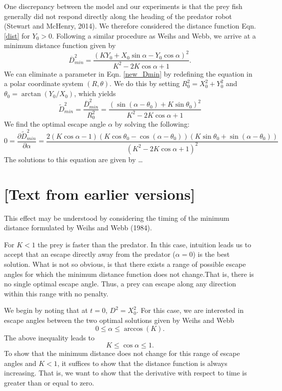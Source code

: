\documentclass[12pt]{article}
\def\ds{\displaystyle}
\def\d{\partial}
\newcommand{\ol}{\overline}
\begin{document}
One discrepancy between the model and our experiments is that the prey fish generally did not respond directly along the heading of the predator robot (Stewart and McHenry, 2014). We therefore considered the distance function Eqn. \ref{dist} for $Y_0>0$. Following a similar procedure as Weihs and Webb, we arrive at a minimum distance function given by
% 
\begin{equation}
\ol D^2_{min}=\frac{(K Y_0+X_0 \sin \alpha -Y_0\cos \alpha)^2}{K^2-2 K \cos \alpha +1}. 
\label{new_Dmin}
\end{equation}
%
We can eliminate a parameter in Eqn. \ref{new_Dmin} by redefining the equation in a polar coordinate system $(R, \theta)$. We do this by setting $R_0^2 = X_0^2 + Y_0^2$ and $\theta_0 = \arctan(Y_0/X_0)$, which yields
%
\begin{equation}
\widetilde{D}^2_{min}= \ds\frac{\ol{D}^2_{min}}{R_0^2 }=
\ds\frac{\left ( \sin(\alpha - \theta_0) + K \sin \theta_0 \right )^2}{K^2-2 K \cos \alpha +1} 
\label{Dmin_polar}
\end{equation}
%
We find the optimal escape angle $\alpha$ by solving the following:
%
\begin{equation}
0 = \frac{\d \widetilde{D}^2_{min}}{\d \alpha} = 
\frac{2(K \cos \alpha - 1)(K\cos \theta_0 - \cos(\alpha - \theta_0))(K\sin \theta_0 + \sin(\alpha -\theta_0))}
{(K^2 - 2K \cos \alpha + 1)^2}
\end{equation} 
%
The solutions to this equation are given by \dots



\section{[Text from earlier versions]}


This effect may be understood by considering the timing of the minimum distance formulated by Weihs and Webb (1984). 

For $K<1$ the prey is faster than the predator. In this case, intuition leads us to accept that an escape directly away from the predator ($\alpha =0$) is the best solution. What is not so obvious, is that there exists a range of possible escape angles for which the minimum distance function does not change.That is, there is no single optimal escape angle. Thus, a prey can escape along any direction within this range with no penalty.

We begin by noting that at $t=0$, $D^2 = X_0^2.$ For this case, we are interested in escape angles between the two optimal solutions given by Weihs and Webb
%
\begin{equation}
0 \leq \alpha \leq \arccos(K).
\label{anglerange}
\end{equation}
The above inequality leads to 
\begin{equation}
K \leq \cos\alpha \leq 1.
\label{cosinebound}
\end{equation}      
%
To show that the minimum distance does not change for this range of escape angles and $K<1$, it suffices to show that the distance function is always increasing. That is, we want to show that the derivative with respect to time is greater than or equal to zero. 
\end{document}
